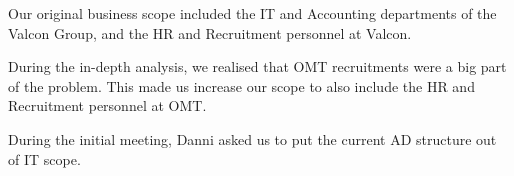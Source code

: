 Our original business scope included the IT and Accounting departments of the Valcon Group, and the HR and Recruitment personnel at Valcon.

During the in-depth analysis, we realised that OMT recruitments were a big part of the problem.
This made us increase our scope to also include the HR and Recruitment personnel at OMT.

During the initial meeting, Danni asked us to put the current AD structure out of IT scope.